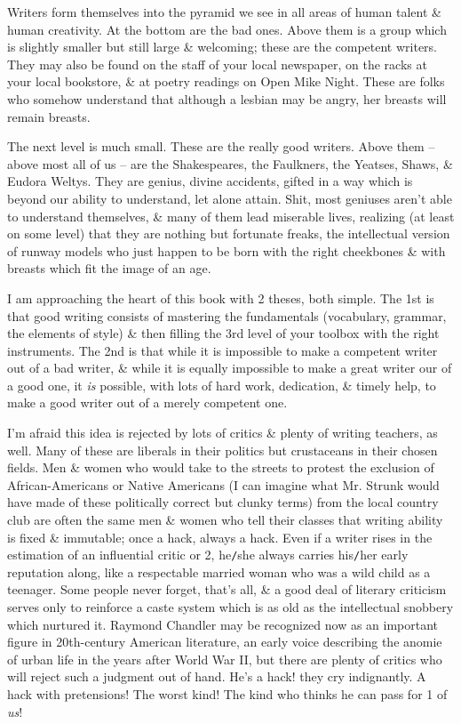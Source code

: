 \documentclass{article}
\numberwithin{equation}{section}
\begin{document}
Writers form themselves into the pyramid we see in all areas of human talent \& human creativity. At the bottom are the bad ones. Above them is a group which is slightly smaller but still large \& welcoming; these are the competent writers. They may also be found on the staff of your local newspaper, on the racks at your local bookstore, \& at poetry readings on Open Mike Night. These are folks who somehow understand that although a lesbian may be angry, her breasts will remain breasts.

The next level is much small. These are the really good writers. Above them -- above most all of us -- are the Shakespeares, the Faulkners, the Yeatses, Shaws, \& Eudora Weltys. They are genius, divine accidents, gifted in a way which is beyond our ability to understand, let alone attain. Shit, most geniuses aren't able to understand themselves, \& many of them lead miserable lives, realizing (at least on some level) that they are nothing but fortunate freaks, the intellectual version of runway models who just happen to be born with the right cheekbones \& with breasts which fit the image of an age.

I am approaching the heart of this book with 2 theses, both simple. The 1st is that good writing consists of mastering the fundamentals (vocabulary, grammar, the elements of style) \& then filling the 3rd level of your toolbox with the right instruments. The 2nd is that while it is impossible to make a competent writer out of a bad writer, \& while it is equally impossible to make a great writer our of a good one, it \textit{is} possible, with lots of hard work, dedication, \& timely help, to make a good writer out of a merely competent one.

I'm afraid this idea is rejected by lots of critics \& plenty of writing teachers, as well. Many of these are liberals in their politics but crustaceans in their chosen fields. Men \& women who would take to the streets to protest the exclusion of African-Americans or Native Americans (I can imagine what Mr. Strunk would have made of these politically correct but clunky terms) from the local country club are often the same men \& women who tell their classes that writing ability is fixed \& immutable; once a hack, always a hack. Even if a writer rises in the estimation of an influential critic or 2, he{\tt/}she always carries his{\tt/}her early reputation along, like a respectable married woman who was a wild child as a teenager. Some people never forget, that's all, \& a good deal of literary criticism serves only to reinforce a caste system which is as old as the intellectual snobbery which nurtured it. Raymond Chandler may be recognized now as an important figure in 20th-century American literature, an early voice describing the anomie of urban life in the years after World War II, but there are plenty of critics who will reject such a judgment out of hand. He's a hack! they cry indignantly. A hack with pretensions! The worst kind! The kind who thinks he can pass for 1 of \textit{us}!
\end{document}
